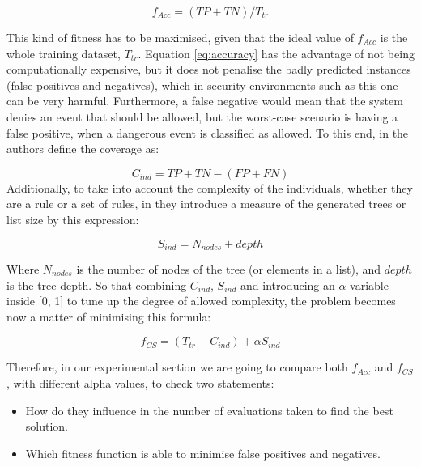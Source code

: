 \documentclass[runningheads]{llncs}
\begin{document}
\begin{equation}
\label{eq:accuracy}
f_{Acc} = (TP + TN) / T_{tr}
\end{equation}

This kind of fitness has to be maximised, given that the ideal value
of $f_{Acc}$ is the whole training dataset, $T_{tr}$. Equation \ref{eq:accuracy} has the 
advantage of not being computationally expensive, but it does not
penalise the badly predicted instances (false positives and
negatives), which in security environments such as this one can be
very harmful. Furthermore, a false negative would mean that the system denies an event that should be allowed, but the worst-case scenario is having a false positive, when a dangerous event is classified as allowed.
To this end, in \cite{witten2005data} the authors define the coverage as:

\begin{equation}
\label{eq:coverage}
C_{ind} = TP + TN - (FP + FN)
\end{equation}
Additionally, to take into account the complexity of the individuals,
whether they are a rule or a set of rules, in \cite{witten2005data}
they introduce a measure of the generated trees or list size by this
expression: 

\begin{equation}
S_{ind} = N_{nodes} + depth
\end{equation}

Where $N_{nodes}$ is the number of nodes of the tree (or elements in a list), and $depth$ is the tree depth. So that combining $C_{ind}$, $S_{ind}$ and introducing an $\alpha$ variable inside [0, 1] to tune up the degree of allowed complexity, the problem becomes now a matter of minimising this formula:

\begin{equation}
\label{eq:complexFitness}
f_{CS} = (T_{tr} - C_{ind}) + \alpha S_{ind}
\end{equation}

Therefore, in our experimental section we are going to compare both
$f_{Acc}$ and $f_{CS}$, with different  alpha values, to check two statements:

\begin{itemize}
	\item How do they influence in the number of evaluations taken to find the best solution.
	\item Which fitness function is able to minimise false
          positives and negatives.
\end{itemize}
\end{document}
